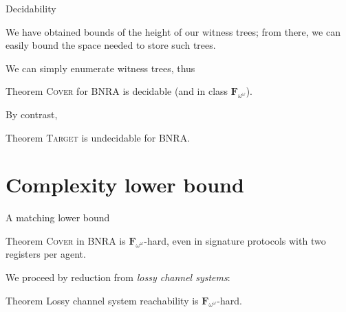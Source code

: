 \documentclass{beamer}
\newcommand{\COVER}{\textsc{Cover}\xspace}
\newcommand{\TARGET}{\textsc{Target}\xspace}
\begin{document}
			
				
				
			
	

\begin{frame}{Decidability}
	
	We have obtained bounds of the height of our witness trees; from there, we can easily bound the space needed to store such trees.
	
	\pause
	We can simply enumerate witness trees, thus
	
	\begin{block}{Theorem}
		{\COVER} for BNRA is decidable (and in class $\mathbf{F}_{\omega^\omega}$).
	\end{block}
	
	\pause
	
	By contrast,
	
	\begin{block}{Theorem}
		{\TARGET} is undecidable for BNRA.
	\end{block}
\end{frame}

\section{Complexity lower bound}

\begin{frame}{A matching lower bound}
		\begin{block}{Theorem}
		{\COVER} in BNRA is $\mathbf{F}_{\omega^\omega}$-hard, even in signature protocols with two registers per agent.
	\end{block}

	\pause 
	We proceed by reduction from \emph{lossy channel systems}: 
	
	\begin{block}{Theorem\footnotemark}
		Lossy channel system reachability is $\mathbf{F}_{\omega^\omega}$-hard.
	\end{block}

\end{frame}
\end{document}
